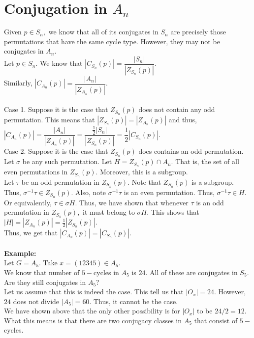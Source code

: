 \documentclass[12 pt, a4paper, toc=graduated, oneside]{article}
\theoremstyle{definition}
\begin{document}
\section{Conjugation in \texorpdfstring{$A_n$}{An}}

Given $p \in S_n,$ we know that all of its conjugates in $S_n$ are precisely those permutations that have the same cycle type. However, they may not be conjugates in $A_n.$ \\
Let $p \in S_n.$ We know that $|C_{S_n}(p)| = \dfrac{|S_n|}{|Z_{S_n}(p)|}.$\\
Similarly, $|C_{A_n}(p)| = \dfrac{|A_n|}{|Z_{A_n}(p)|}.$\\~\\
Case 1. Suppose it is the case that $Z_{S_n}(p)$ does not contain any odd permutation. This means that $|Z_{S_n}(p)| = |Z_{A_n}(p)|$ and thus, $|C_{A_n}(p)| = \dfrac{|A_n|}{|Z_{A_n}(p)|} = \dfrac{\frac{1}{2}|S_n|}{|Z_{S_n}(p)|} = \dfrac{1}{2}|C_{S_n}(p)|.$\\
Case 2. Suppose it is the case that $Z_{S_n}(p)$ does contains an odd permutation. Let $\sigma$ be any such permutation. Let $H = Z_{S_n}(p) \cap A_n.$ That is, the set of all even permutations in $Z_{S_n}(p).$ Moreover, this is a subgroup.\\
Let $\tau$ be an odd permutation in $Z_{S_n}(p).$ Note that $Z_{S_n}(p)$ is a subgroup. Thus, $\sigma^{-1}\tau\in Z_{S_n}(p).$ Also, note $\sigma^{-1}\tau$ is an even permutation. Thus, $\sigma^{-1}\tau\in H.$ Or equivalently, $\tau \in \sigma H.$ Thus, we have shown that whenever $\tau$ is an odd permutation in $Z_{S_n}(p),$ it must belong to $\sigma H.$ This shows that $|H| = |Z_{A_n}(p)| = \frac{1}{2}|Z_{S_n}(p)|.$\\
Thus, we get that $|C_{A_n}(p)| = |C_{S_n}(p)|.$\\~\\

\textbf{Example:}\\
Let $G = A_5.$ Take $x = (12345) \in A_5.$\\
We know that number of $5-$cycles in $A_5$ is $24.$ All of these are conjugates in $S_5.$ Are they still conjugates in $A_5?$\\
Let us assume that this is indeed the case. This tell us that $|O_x| = 24.$ However, $24$ does not divide $|A_5| = 60.$ Thus, it cannot be the case.\\
We have shown above that the only other possibility is for $|O_x|$ to be $24/2 = 12.$\\
What this means is that there are two conjugacy classes in $A_5$ that consist of $5-$cycles.
\end{document}
